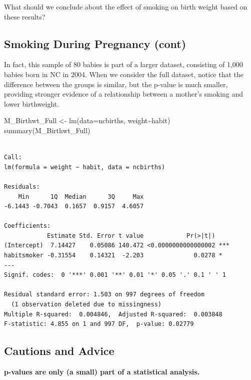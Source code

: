 \documentclass[
  letterpaper,
  DIV=11,
  numbers=noendperiod]{scrreprt}
\newenvironment{Shaded}{\begin{snugshade}}{\end{snugshade}}
\newcommand{\AttributeTok}[1]{\textcolor[rgb]{0.40,0.45,0.13}{#1}}
\newcommand{\FunctionTok}[1]{\textcolor[rgb]{0.28,0.35,0.67}{#1}}
\newcommand{\NormalTok}[1]{\textcolor[rgb]{0.00,0.23,0.31}{#1}}
\newcommand{\OtherTok}[1]{\textcolor[rgb]{0.00,0.23,0.31}{#1}}
\newcommand{\SpecialCharTok}[1]{\textcolor[rgb]{0.37,0.37,0.37}{#1}}
\begin{document}
What should we conclude about the effect of smoking on birth weight
based on these results?

\subsection{Smoking During Pregnancy
(cont)}\label{smoking-during-pregnancy-cont}

In fact, this sample of 80 babies is part of a larger dataset,
consisting of 1,000 babies born in NC in 2004. When we consider the full
dataset, notice that the difference between the groups is similar, but
the p-value is much smaller, providing stronger evidence of a
relationship between a mother's smoking and lower birthweight.

\begin{Shaded}
\begin{Highlighting}[]
\NormalTok{M\_Birthwt\_Full }\OtherTok{\textless{}{-}} \FunctionTok{lm}\NormalTok{(}\AttributeTok{data=}\NormalTok{ncbirths, weight}\SpecialCharTok{\textasciitilde{}}\NormalTok{habit)}
\FunctionTok{summary}\NormalTok{(M\_Birthwt\_Full)}
\end{Highlighting}
\end{Shaded}

\begin{verbatim}

Call:
lm(formula = weight ~ habit, data = ncbirths)

Residuals:
    Min      1Q  Median      3Q     Max 
-6.1443 -0.7043  0.1657  0.9157  4.6057 

Coefficients:
            Estimate Std. Error t value            Pr(>|t|)    
(Intercept)  7.14427    0.05086 140.472 <0.0000000000000002 ***
habitsmoker -0.31554    0.14321  -2.203              0.0278 *  
---
Signif. codes:  0 '***' 0.001 '**' 0.01 '*' 0.05 '.' 0.1 ' ' 1

Residual standard error: 1.503 on 997 degrees of freedom
  (1 observation deleted due to missingness)
Multiple R-squared:  0.004846,  Adjusted R-squared:  0.003848 
F-statistic: 4.855 on 1 and 997 DF,  p-value: 0.02779
\end{verbatim}

\subsection{Cautions and Advice}\label{cautions-and-advice-1}

\textbf{p-values are only (a small) part of a statistical analysis.}
\end{document}
